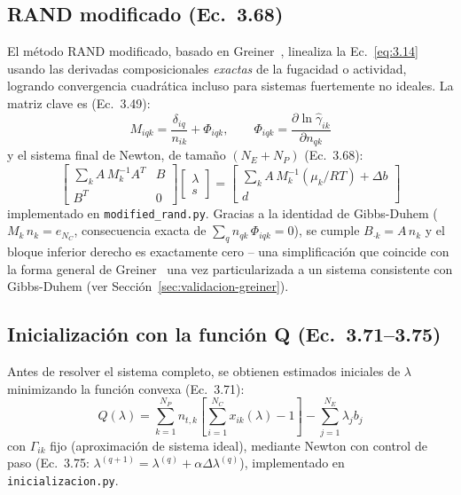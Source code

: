 \documentclass[11pt,a4paper]{article}
\begin{document}
\subsection{RAND modificado (Ec.~3.68)}
\label{sec:rand}

El método RAND modificado, basado en Greiner~\citep{greiner1991},
linealiza la Ec.~\eqref{eq:3.14} usando las derivadas composicionales
\emph{exactas} de la fugacidad o actividad, logrando convergencia
cuadrática incluso para sistemas fuertemente no ideales. La matriz
clave es (Ec.~3.49):
\begin{equation}
  M_{iqk} = \frac{\delta_{iq}}{n_{ik}} + \Phi_{iqk}, \qquad
  \Phi_{iqk} = \frac{\partial \ln\hat\gamma_{ik}}{\partial n_{qk}}
  \label{eq:3.49}
\end{equation}
y el sistema final de Newton, de tamaño $(N_E+N_P)$ (Ec.~3.68):
\begin{equation}
  \begin{bmatrix}
    \sum_k A\,M_k^{-1}A^T & B \\
    B^T & 0
  \end{bmatrix}
  \begin{bmatrix}\lambda \\ s\end{bmatrix}
  =
  \begin{bmatrix}\sum_k A\,M_k^{-1}(\mu_k/RT) + \Delta b \\ d\end{bmatrix}
  \label{eq:3.68}
\end{equation}
implementado en \texttt{modified\_rand.py}. Gracias a la identidad de
Gibbs-Duhem ($M_k\,n_k = e_{N_C}$, consecuencia exacta de
$\sum_q n_{qk}\,\Phi_{iqk}=0$), se cumple $B_{\cdot k} = A\,n_k$ y el
bloque inferior derecho es exactamente cero -- una simplificación que
coincide con la forma general de Greiner~\citep{greiner1991} una vez
particularizada a un sistema consistente con Gibbs-Duhem (ver
Sección~\ref{sec:validacion-greiner}).

\subsection{Inicialización con la función Q (Ec.~3.71--3.75)}

Antes de resolver el sistema completo, se obtienen estimados iniciales
de $\lambda$ minimizando la función convexa (Ec.~3.71):
\begin{equation}
  Q(\lambda) = \sum_{k=1}^{N_P} n_{t,k}\left[\sum_{i=1}^{N_C} x_{ik}(\lambda) - 1\right] - \sum_{j=1}^{N_E}\lambda_j b_j
  \label{eq:3.71}
\end{equation}
con $\Gamma_{ik}$ fijo (aproximación de sistema ideal), mediante Newton
con control de paso (Ec.~3.75: $\lambda^{(q+1)}=\lambda^{(q)}+\alpha\Delta\lambda^{(q)}$),
implementado en \texttt{inicializacion.py}.
\end{document}
